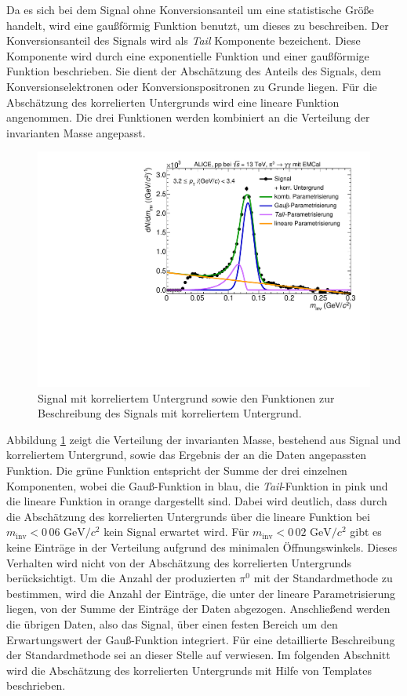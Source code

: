 Da es sich bei dem Signal ohne Konversionsanteil um eine statistische Größe handelt, wird eine gaußförmig Funktion benutzt, um dieses zu beschreiben.
\newline
Der Konversionsanteil des Signals wird als \textit{Tail} Komponente bezeichent.
Diese Komponente wird durch eine exponentielle Funktion und einer gaußförmige Funktion beschrieben.
Sie dient der Abschätzung des Anteils des Signals, dem Konversionselektronen oder Konversionspositronen zu Grunde liegen.
Für die Abschätzung des korrelierten Untergrunds wird eine lineare Funktion angenommen.
Die drei Funktionen werden kombiniert an die Verteilung der invarianten Masse angepasst.
\begin{figure}[tp]
\centering
\includegraphics[width=.75\linewidth]{StandardParam.pdf}
\caption{Signal mit korreliertem Untergrund sowie den Funktionen zur Beschreibung des Signals mit korreliertem Untergrund.}
\label{figStandardParam}
\end{figure}
\newline
Abbildung \ref{figStandardParam} zeigt die Verteilung der invarianten Masse, bestehend aus Signal und korreliertem Untergrund, sowie das Ergebnis der an die Daten angepassten Funktion.
Die grüne Funktion entspricht der Summe der drei einzelnen Komponenten, wobei die Gauß-Funktion in blau, die \textit{Tail}-Funktion in pink und die lineare Funktion in orange dargestellt sind.
Dabei wird deutlich, dass durch die Abschätzung des korrelierten Untergrunds über die lineare Funktion bei $m_\text{inv} < 0\,06\text{ GeV}/c^{2}$ kein Signal erwartet wird.
Für $m_\text{inv} < 0\,02\text{ GeV}/c^{2}$ gibt es keine Einträge in der Verteilung aufgrund des minimalen Öffnungswinkels.
Dieses Verhalten wird nicht von der Abschätzung des korrelierten Untergrunds berücksichtigt.
\newline
Um die Anzahl der produzierten $\pi^{0}$ mit der Standardmethode zu bestimmen, wird die Anzahl der Einträge, die unter der lineare Parametrisierung liegen, von der Summe der Einträge der Daten abgezogen.
Anschließend werden die übrigen Daten, also das Signal, über einen festen Bereich um den Erwartungswert der Gauß-Funktion integriert.
Für eine detaillierte Beschreibung der Standardmethode sei an dieser Stelle auf \cite{thesis:Adrian} verwiesen.
\newline
Im folgenden Abschnitt wird die Abschätzung des korrelierten Untergrunds mit Hilfe von Templates beschrieben.